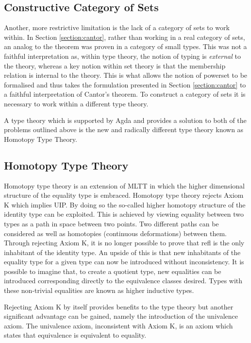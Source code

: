 \subsection{Constructive Category of Sets}
\label{section:sets}
Another, more restrictive limitation is the lack of a category of sets to work
within. In Section \ref{section:cantor}, rather than working in a
real category of sets, an analog to the theorem was proven in a category of
small types. This was not a faithful interpretation as, within type theory, the
notion of typing is \textit{external} to the theory, whereas a key notion within
set theory is that the membership relation is internal to the theory. This is
what allows the notion of powerset to be formalised and thus takes the
formulation presented in Section \ref{section:cantor} to a faithful
interpretation of Cantor's theorem. To construct a category of
sets it is necessary to work within a different type theory.

A type theory which is supported by Agda and provides a solution to both of the
problems outlined above is the new and radically different type theory known as
Homotopy Type Theory.

\subsection{Homotopy Type Theory}
\label{section:hott}
Homotopy type theory is an extension of MLTT in which the
higher dimensional structure of the equality type is embraced. Homotopy type
theory rejects \textsf{Axiom K} which implies UIP. By doing so the so-called higher
homotopy structure of the identity type can be exploited. This is achieved by
viewing equality between two types as a path in space between two points. Two
different paths can be considered as well as homotopies (continuous
deformations) between them. Through rejecting \textsf{Axiom K}, it is no longer
possible to prove that \textsf{refl} is the only inhabitant of the identity
type. An upside of this is that new inhabitants of the equality type for a given
type can now be introduced without inconsistency. It is possible to imagine
that, to create a quotient type, new equalities can be introduced corresponding
directly to the equivalence classes desired. Types with these non-trivial
equalities are known as higher inductive types.

Rejecting \textsf{Axiom K} by itself provides benefits to the type theory but
another significant advantage can be gained, namely the introduction of the
univalence axiom. The univalence axiom, inconsistent with
\textsf{Axiom K}, is an axiom which states that equivalence is equivalent to
equality.

